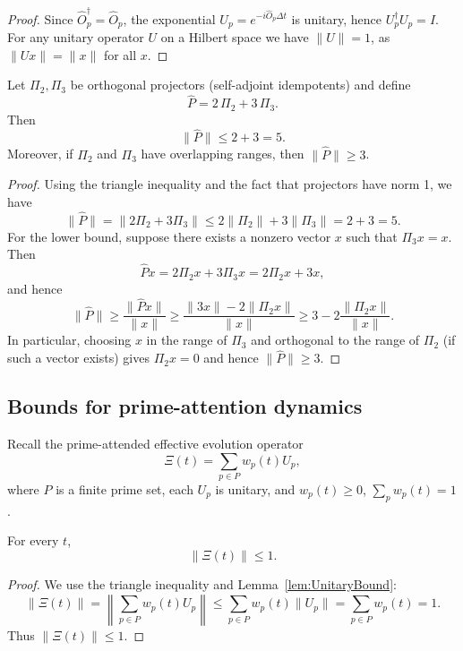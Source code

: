 \documentclass[11pt]{article}
\begin{document}
\begin{proof}
Since $\hat{O}_p^\dagger = \hat{O}_p$, the exponential $U_p = e^{-i \hat{O}_p \Delta t}$ is unitary, hence $U_p^\dagger U_p = I$. For any unitary operator $U$ on a Hilbert space we have $\|U\|=1$, as $\|Ux\|=\|x\|$ for all $x$.
\end{proof}

\begin{lemma}
\label{lem:PrimeSpectrumBound}
Let $\Pi_2,\Pi_3$ be orthogonal projectors (self-adjoint idempotents) and define
\[
\hat{P} = 2\,\Pi_2 + 3\,\Pi_3.
\]
Then
\[
\|\hat{P}\| \le 2 + 3 = 5.
\]
Moreover, if $\Pi_2$ and $\Pi_3$ have overlapping ranges, then $\|\hat{P}\|\ge 3$.
\end{lemma}

\begin{proof}
Using the triangle inequality and the fact that projectors have norm 1, we have
\[
\|\hat{P}\| = \|2\Pi_2 + 3\Pi_3\| \le 2\|\Pi_2\| + 3\|\Pi_3\| = 2 + 3 = 5.
\]
For the lower bound, suppose there exists a nonzero vector $x$ such that $\Pi_3 x = x$. Then
\[
\hat{P} x = 2 \Pi_2 x + 3 \Pi_3 x = 2 \Pi_2 x + 3x,
\]
and hence
\[
\|\hat{P}\| \ge \frac{\|\hat{P}x\|}{\|x\|} \ge \frac{\|3x\| - 2\|\Pi_2 x\|}{\|x\|} \ge 3 - 2 \frac{\|\Pi_2 x\|}{\|x\|}.
\]
In particular, choosing $x$ in the range of $\Pi_3$ and orthogonal to the range of $\Pi_2$ (if such a vector exists) gives $\Pi_2 x=0$ and hence $\|\hat{P}\|\ge 3$.
\end{proof}

\subsection{Bounds for prime-attention dynamics}

Recall the prime-attended effective evolution operator
\[
\Xi(t) = \sum_{p\in P} w_p(t) U_p,
\]
where $P$ is a finite prime set, each $U_p$ is unitary, and $w_p(t)\ge 0$, $\sum_p w_p(t)=1$.

\begin{lemma}
\label{lem:XiNormBound}
For every $t$,
\[
\|\Xi(t)\| \le 1.
\]
\end{lemma}

\begin{proof}
We use the triangle inequality and Lemma~\ref{lem:UnitaryBound}:
\[
\|\Xi(t)\| = \left\|\sum_{p\in P} w_p(t) U_p\right\|
\le \sum_{p\in P} w_p(t) \|U_p\|
= \sum_{p\in P} w_p(t) = 1.
\]
Thus $\|\Xi(t)\|\le 1$.
\end{proof}
\end{document}
